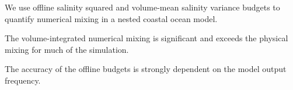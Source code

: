 \documentclass[draft]{agujournal2019}
\begin{document}


\begin{keypoints}
\item We use offline salinity squared and volume-mean salinity variance budgets to quantify numerical mixing in a nested coastal ocean model.
\item The volume-integrated numerical mixing is significant and exceeds the physical mixing for much of the simulation.
\item The accuracy of the offline budgets is strongly dependent on the model output frequency.
\end{keypoints}

%
%

%
%

\end{document}
